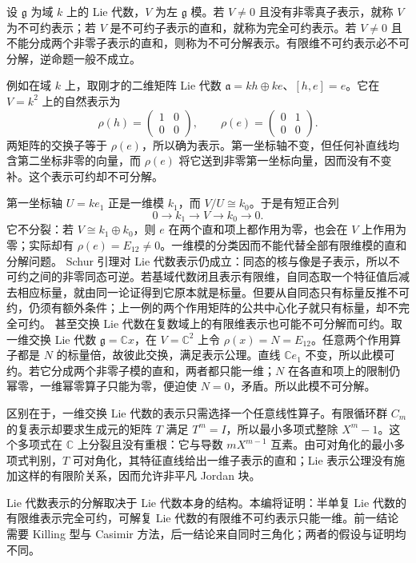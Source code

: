 \begin{definition}\label{b5:def:lie-simple-semisimple-module}
	设 \(\mathfrak g\) 为域 \(k\) 上的 Lie 代数，\(V\) 为左 \(\mathfrak g\) 模。若 \(V\ne0\) 且没有非零真子表示，就称 \(V\) 为不可约表示；若 \(V\) 是不可约子表示的直和，就称为完全可约表示。若 \(V\ne0\) 且不能分成两个非零子表示的直和，则称为不可分解表示。有限维不可约表示必不可分解，逆命题一般不成立。
\end{definition}
例如在域 \(k\) 上，取刚才的二维矩阵 Lie 代数 \(\mathfrak a=kh\oplus ke\)、\([h,e]=e\)。它在 \(V=k^2\) 上的自然表示为
\[
	\rho(h)=\begin{pmatrix}1&0\\0&0\end{pmatrix},\qquad
	\rho(e)=\begin{pmatrix}0&1\\0&0\end{pmatrix}.
\]
两矩阵的交换子等于 \(\rho(e)\)，所以确为表示。第一坐标轴不变，但任何补直线均含第二坐标非零的向量，而 \(\rho(e)\) 将它送到非零第一坐标向量，因而没有不变补。这个表示可约却不可分解。

\ProseParagraphBreak

第一坐标轴 \(U=ke_1\) 正是一维模 \(k_1\)，而 \(V/U\cong k_0\)。于是有短正合列
\[
	0\longrightarrow k_1\longrightarrow V\longrightarrow k_0\longrightarrow0.
\]
它不分裂：若 \(V\cong k_1\oplus k_0\)，则 \(e\) 在两个直和项上都作用为零，也会在 \(V\) 上作用为零；实际却有 \(\rho(e)=E_{12}\ne0\)。一维模的分类因而不能代替全部有限维模的直和分解问题。
\ProseParagraphBreak
Schur 引理对 Lie 代数表示仍成立：同态的核与像是子表示，所以不可约之间的非零同态可逆。若基域代数闭且表示有限维，自同态取一个特征值后减去相应标量，就由同一论证得到它原本就是标量。但要从自同态只有标量反推不可约，仍须有额外条件；上一例的两个作用矩阵的公共中心化子就只有标量，却不完全可约。
\ProseParagraphBreak
甚至交换 Lie 代数在复数域上的有限维表示也可能不可分解而可约。取一维交换 Lie 代数 \(\mathfrak g=\mathbb Cx\)，在 \(V=\mathbb C^2\) 上令 \(\rho(x)=N=E_{12}\)。任意两个作用算子都是 \(N\) 的标量倍，故彼此交换，满足表示公理。直线 \(\mathbb Ce_1\) 不变，所以此模可约。若它分成两个非零子模的直和，两者都只能一维；\(N\) 在各直和项上的限制仍幂零，一维幂零算子只能为零，便迫使 \(N=0\)，矛盾。所以此模不可分解。

\ProseParagraphBreak

区别在于，一维交换 Lie 代数的表示只需选择一个任意线性算子。有限循环群 \(C_m\) 的复表示却要求生成元的矩阵 \(T\) 满足 \(T^m=I\)，所以最小多项式整除 \(X^m-1\)。这个多项式在 \(\mathbb C\) 上分裂且没有重根：它与导数 \(mX^{m-1}\) 互素。由可对角化的最小多项式判别，\(T\) 可对角化，其特征直线给出一维子表示的直和；Lie 表示公理没有施加这样的有限阶关系，因而允许非平凡 Jordan 块。

\ProseParagraphBreak

Lie 代数表示的分解取决于 Lie 代数本身的结构。本编将证明：半单复 Lie 代数的有限维表示完全可约，可解复 Lie 代数的有限维不可约表示只能一维。前一结论需要 Killing 型与 Casimir 方法，后一结论来自同时三角化；两者的假设与证明均不同。
